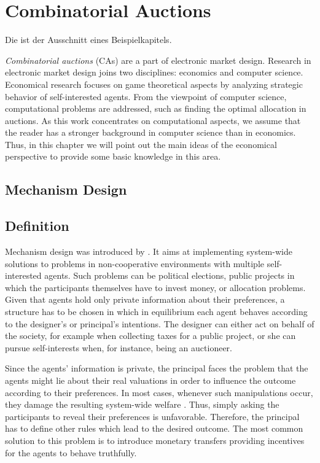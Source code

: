\section{Combinatorial Auctions}
 \label{sec:combinatorialAuctions}

Die ist der Ausschnitt eines Beispielkapitels.

\emph{Combinatorial auctions} (CAs) are a part of electronic
market design. Research in electronic market design joins two
disciplines: economics and computer science. Economical research
focuses on game theoretical aspects by analyzing strategic
behavior of self-interested agents. From the viewpoint of computer
science, computational problems are addressed, such as finding the
optimal allocation in auctions. As this work concentrates on
computational aspects, we assume that the reader has a stronger
background in computer science than in economics. Thus, in this
chapter we will point out the main ideas of the economical
perspective to provide some basic knowledge in this area.

\subsection{Mechanism Design}
\subsection{Definition}
Mechanism design was introduced by \textcite{Hu60}. It
aims at implementing system-wide solutions to problems in
non-cooperative environments with multiple self-interested agents.
Such problems can be political elections, public projects in which
the participants themselves have to invest money, or allocation
problems. Given that agents hold only private information about
their preferences, a structure has to be chosen in which in
equilibrium each agent behaves according to the designer's or principal's
intentions. The designer can either act on behalf of the society, for
example when collecting taxes for a public project, or she can
pursue self-interests when, for instance, being an auctioneer.

Since the agents' information is private, the principal faces the
problem that the agents might lie about their real valuations in
order to influence the outcome according to their preferences. In
most cases, whenever such manipulations occur, they damage the
resulting system-wide welfare \parencite{NiRo00}. Thus, simply asking
the participants to reveal their preferences is unfavorable.
Therefore, the principal has to define other rules which lead to
the desired outcome. The most common solution to this problem is
to introduce monetary transfers providing incentives for the
agents to behave truthfully.

